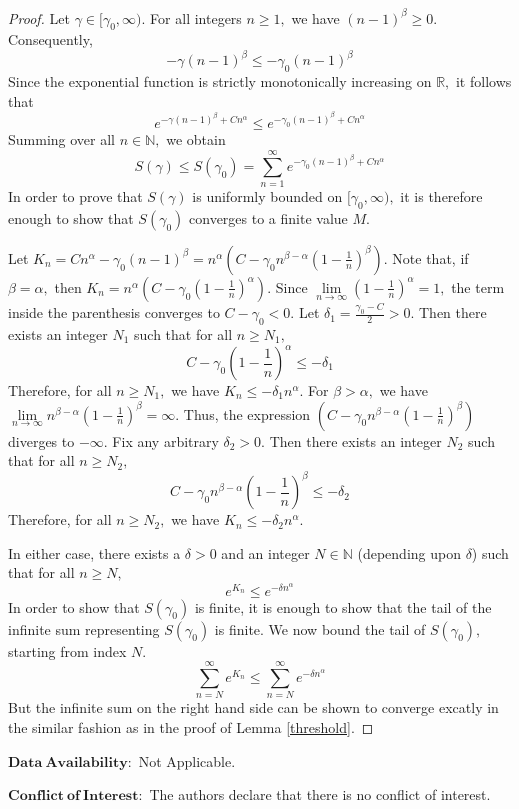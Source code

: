 \documentclass[a4paper,11pt,reqno]{amsart}
\theoremstyle{plain}
\theoremstyle{mainthmstyle}
\theoremstyle{named}
\numberwithin{equation}{section}
\begin{document}
\begin{proof} Let $\gamma \in [\gamma_0, \infty).$ For all integers $n \geq 1,$ we have $(n-1)^\beta \geq 0.$ Consequently,
$$-\gamma (n-1)^\beta \leq -\gamma_0 (n-1)^\beta$$
Since the exponential function is strictly monotonically increasing on $\mathbb{R},$ it follows that
$$e^{-\gamma (n - 1)^{\beta} + C n^{\alpha}} \leq e^{-\gamma_0 (n - 1)^{\beta} + C n^{\alpha}}$$
Summing over all $n \in \mathbb{N},$ we obtain
$$S(\gamma) \leq S(\gamma_0) = \sum_{n = 1}^{\infty} e^{-\gamma_0 (n - 1)^{\beta} + C n^{\alpha}}$$
In order to prove that $S(\gamma)$ is uniformly bounded on $[\gamma_0, \infty),$ it is therefore enough to show that $S(\gamma_0)$ converges to a finite value $M.$


Let $K_n = C n^{\alpha} - \gamma_0 (n - 1)^{\beta} = n^\alpha \left( C - \gamma_0 n^{\beta - \alpha} \left(1 - \frac{1}{n}\right)^\beta \right).$ Note that, if $\beta = \alpha,$ then $K_n = n^\alpha \left( C - \gamma_0 \left(1 - \frac{1}{n}\right)^\alpha \right).$
Since $\lim\limits_{n \to \infty} \left(1 - \frac{1}{n}\right)^\alpha = 1,$ the term inside the parenthesis converges to $C - \gamma_0 < 0.$
Let $\delta_1 = \frac{\gamma_0 - C}{2} > 0.$ Then there exists an integer $N_1$ such that for all $n \geq N_1,$
$$C - \gamma_0 \left(1 - \frac{1}{n}\right)^\alpha \leq -\delta_1$$
Therefore, for all $n \geq N_1,$ we have $K_n \leq -\delta_1 n^\alpha.$
For $\beta > \alpha,$ we have $\lim\limits_{n \to \infty} n^{\beta - \alpha} \left(1 - \frac{1}{n}\right)^{\beta} = \infty.$
Thus, the expression $\left( C - \gamma_0 n^{\beta - \alpha} \left(1 - \frac{1}{n}\right)^\beta \right)$ diverges to $-\infty.$
Fix any arbitrary $\delta_2 > 0.$ Then there exists an integer $N_2$ such that for all $n \geq N_2,$
$$C - \gamma_0 n^{\beta - \alpha} \left(1 - \frac{1}{n}\right)^{\beta} \leq -\delta_2$$
Therefore, for all $n \geq N_2,$ we have $K_n \leq -\delta_2 n^{\alpha}.$

\vspace{0.5em}
In either case, there exists a $\delta > 0$ and an integer $N \in \mathbb{N}$ (depending upon $\delta$) such that for all $n \geq N,$ 
$$e^{K_n} \leq e^{-\delta n^\alpha}$$
In order to show that $S \left (\gamma_0 \right )$ is finite, it is enough to show that the tail of the infinite sum representing $S \left (\gamma_0 \right )$ is finite. We now bound the tail of $S \left (\gamma_0 \right ),$ starting from index $N.$
$$\sum_{n=N}^{\infty} e^{K_n} \leq \sum_{n=N}^{\infty} e^{-\delta n^\alpha}$$
But the infinite sum on the right hand side can be shown to converge excatly in the similar fashion as in the proof of Lemma \ref{threshold}. 
\end{proof}

$\mathbf{Data\ Availability}:$ Not Applicable.

\vspace{2em}

$\mathbf{Conflict\ of\ Interest}:$ The authors declare that there is no conflict of interest.



\end{document}
